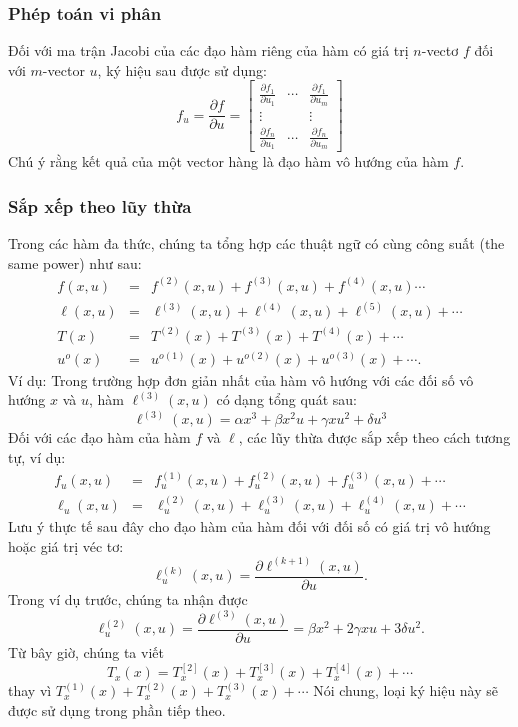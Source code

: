 \documentclass[12pt,a4paper]{report}
\begin{document}
\subsubsection{Phép toán vi phân} Đối với ma trận Jacobi của các đạo hàm riêng của hàm có giá trị $n$-vectơ $f$ đối với $m$-vector $u$, ký hiệu sau được sử dụng: $$f_u = \frac{\partial f}{\partial u} = \begin{bmatrix}
\frac{\partial f_1}{\partial u_1} & \cdots & \frac{\partial f_1}{\partial u_m}\\ \vdots && \vdots \\ \frac{\partial f_n}{\partial u_1} &\cdots& \frac{\partial f_n}{\partial u_m}
\end{bmatrix}$$
Chú ý rằng kết quả của một vector hàng là đạo hàm vô hướng của hàm $f$.
\subsubsection{Sắp xếp theo lũy thừa} Trong các hàm đa thức, chúng ta tổng hợp các thuật ngữ có cùng công suất (the same power) như sau: \begin{eqnarray}
	f(x, u) &=& f^{(2)}(x, u) + f^{(3)}(x, u) + f^{(4)}(x, u)\cdots \nonumber \\
	\ell(x, u) &=& \ell^{(3)}(x, u) + \ell^{(4)}(x, u) + \ell^{(5)}(x, u) + \cdots \nonumber \\
	T(x) &=& T^{(2)}(x) + T^{(3)}(x) + T^{(4)}(x) + \cdots \nonumber \\ u^o(x) &=& u^{o(1)}(x) + u^{o(2)}(x) + u^{o(3)}(x) + \cdots \nonumber .
\end{eqnarray}
Ví dụ: Trong trường hợp đơn giản nhất của hàm vô hướng với các đối số vô hướng $x$ và $u$, hàm $\ell^{(3)}(x, u)$ có dạng tổng quát sau: $$\ell^{(3)}(x, u) = \alpha x^3 + \beta x^2u + \gamma xu^2 + \delta u^3$$
Đối với các đạo hàm của hàm $f$ và $\ell$, các lũy thừa được sắp xếp theo cách tương tự, ví dụ: \begin{eqnarray}
	f_u(x, u) &=& f_u^{(1)}(x, u) + f_u^{(2)}(x, u) + f_u^{(3)}(x, u) + \cdots \nonumber \\ \ell_u(x, u) &=& \ell_u^{(2)}(x, u) + \ell_u^{(3)}(x, u) + \ell_u^{(4)}(x, u) + \cdots \nonumber
\end{eqnarray}
Lưu ý thực tế sau đây cho đạo hàm của hàm đối với đối số có giá trị vô hướng hoặc giá trị véc tơ: $$\ell_u^{(k)}(x, u) = \frac{\partial\ell^{(k+1)}(x, u)}{\partial u}.$$
Trong ví dụ trước, chúng ta nhận được
$$\ell_u^{(2)}(x, u) = \frac{\partial\ell^{(3)}(x, u)}{\partial u} = \beta x^2 + 2\gamma xu + 3\delta u^2.$$ Từ bây giờ, chúng ta viết $$T_x(x) = T_x^{[2]}(x) + T_x^{[3]}(x) + T_x^{[4]}(x) + \cdots$$ thay vì $T_x^{(1)}(x) + T_x^{(2)}(x) + T_x^{(3)}(x) + \cdots$
Nói chung, loại ký hiệu này sẽ được sử dụng trong phần tiếp theo. 
\end{document}
